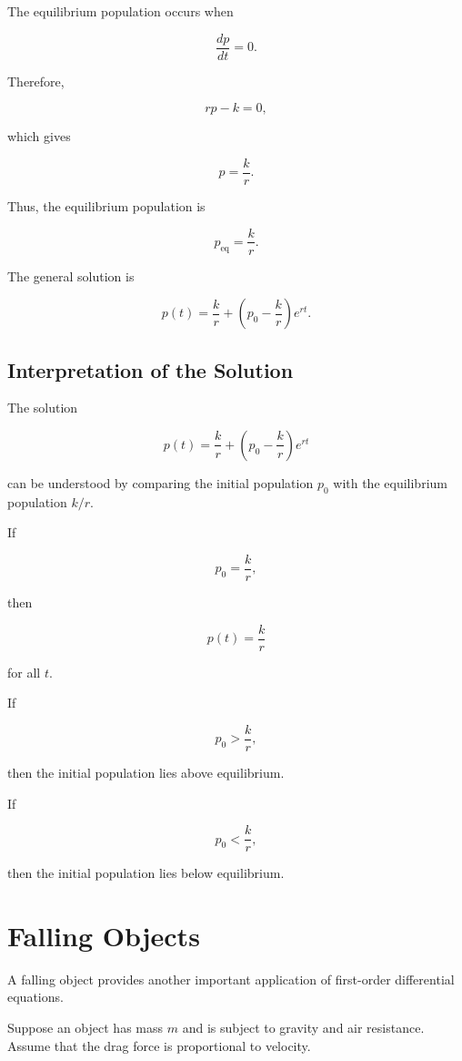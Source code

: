 \documentclass[11pt]{article}
\begin{document}
The equilibrium population occurs when

\[
\frac{dp}{dt}=0.
\]

Therefore,

\[
rp-k=0,
\]

which gives

\[
p=\frac{k}{r}.
\]

Thus, the equilibrium population is

\[
\boxed{
p_{\mathrm{eq}}=\frac{k}{r}
}.
\]

The general solution is

\[
\boxed{
p(t)
=
\frac{k}{r}
+
\left(
p_0-\frac{k}{r}
\right)e^{rt}
}.
\]

\subsection{Interpretation of the Solution}

The solution

\[
p(t)
=
\frac{k}{r}
+
\left(
p_0-\frac{k}{r}
\right)e^{rt}
\]

can be understood by comparing the initial population $p_0$ with the
equilibrium population $k/r$.

If

\[
p_0=\frac{k}{r},
\]

then

\[
p(t)=\frac{k}{r}
\]

for all $t$.

If

\[
p_0>\frac{k}{r},
\]

then the initial population lies above equilibrium.

If

\[
p_0<\frac{k}{r},
\]

then the initial population lies below equilibrium.

\section{Falling Objects}

A falling object provides another important application of first-order
differential equations.

Suppose an object has mass $m$ and is subject to gravity and air
resistance. Assume that the drag force is proportional to velocity.
\end{document}
